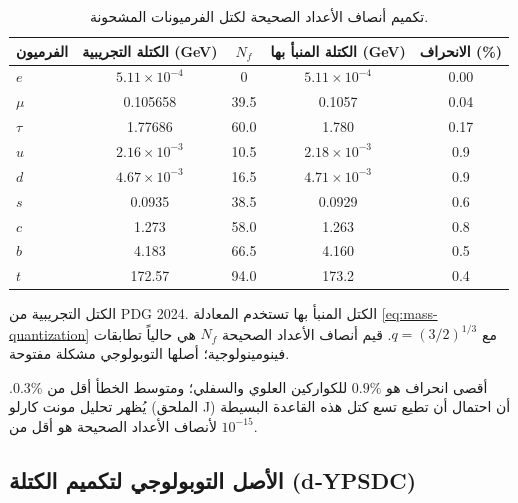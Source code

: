 \documentclass[12pt,a4paper]{article}
\begin{document}
	\begin{table}[H]
		\centering
		\caption{تكميم أنصاف الأعداد الصحيحة لكتل الفرميونات المشحونة.}
		\label{tab:fermions}
		\begin{tabular}{l c c c c}
			\toprule
			الفرميون & الكتلة التجريبية (GeV) & \(N_f\) & الكتلة المنبأ بها (GeV) & الانحراف (\%) \\
			\midrule
			\(e\)   & \(5.11\times10^{-4}\) & 0      & \(5.11\times10^{-4}\) & 0.00 \\
			\(\mu\)  & 0.105658             & 39.5   & 0.1057               & 0.04 \\
			\(\tau\) & 1.77686              & 60.0   & 1.780                & 0.17 \\
			\(u\)   & \(2.16\times10^{-3}\) & 10.5   & \(2.18\times10^{-3}\) & 0.9 \\
			\(d\)   & \(4.67\times10^{-3}\) & 16.5   & \(4.71\times10^{-3}\) & 0.9 \\
			\(s\)   & 0.0935               & 38.5   & 0.0929               & 0.6 \\
			\(c\)   & 1.273                & 58.0   & 1.263                & 0.8 \\
			\(b\)   & 4.183                & 66.5   & 4.160                & 0.5 \\
			\(t\)   & 172.57               & 94.0   & 173.2                & 0.4 \\
			\bottomrule
		\end{tabular}
		\par\smallskip
		\footnotesize
		الكتل التجريبية من PDG 2024. الكتل المنبأ بها تستخدم المعادلة \eqref{eq:mass-quantization} مع \(q = (3/2)^{1/3}\). قيم أنصاف الأعداد الصحيحة \(N_f\) هي حالياً تطابقات فينومينولوجية؛ أصلها التوبولوجي مشكلة مفتوحة.
	\end{table}
	
	أقصى انحراف هو \(0.9\%\) للكواركين العلوي والسفلي؛ ومتوسط الخطأ أقل من \(0.3\%\). يُظهر تحليل مونت كارلو (الملحق J) أن احتمال أن تطيع تسع كتل هذه القاعدة البسيطة لأنصاف الأعداد الصحيحة هو أقل من \(10^{-15}\).
	
	\subsection{الأصل التوبولوجي لتكميم الكتلة (d‑YPSDC)}
	\label{subsec:topo-mass}
	\label{sec:d-ypsdc-model}
	
\end{document}
